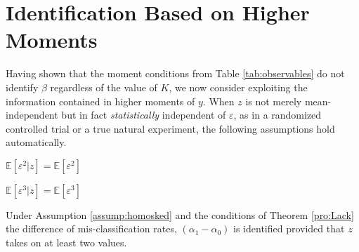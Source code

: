 \section{Identification Based on Higher Moments}
Having shown that the moment conditions from Table \ref{tab:observables} do not identify $\beta$ regardless of the value of $K$, we now consider exploiting the information contained in higher moments of $y$. 
When $z$ is not merely mean-independent but in fact \emph{statistically} independent of $\varepsilon$, as in a randomized controlled trial or a true natural experiment, the following assumptions hold automatically.
\begin{assump}
  $\mathbb{E}[\varepsilon^2|z]=\mathbb{E}[\varepsilon^2]$
  \label{assump:homosked}
\end{assump}
\begin{assump}
  $\mathbb{E}[\varepsilon^3|z]=\mathbb{E}[\varepsilon^3]$
  \label{assump:skew}
\end{assump}
\begin{thm}
  \label{pro:homosked}
  Under Assumption \ref{assump:homosked} and the conditions of Theorem \ref{pro:Lack} the difference of mis-classification rates, $(\alpha_1 - \alpha_0)$ is identified provided that $z$ takes on at least two values.
\end{thm}
